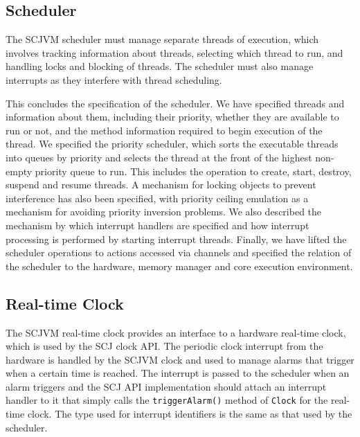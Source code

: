 \subsection{Scheduler}
\label{scheduler-model-section}

The SCJVM scheduler must manage separate threads of execution, which
involves tracking information about threads, selecting which thread to
run, and handling locks and blocking of threads.
The scheduler must also manage interrupts as they interfere with
thread scheduling.



This concludes the specification of the scheduler.
We have specified threads and information about them, including their
priority, whether they are available to run or not, and the method
information required to begin execution of the thread.
We specified the priority scheduler, which sorts the executable
threads into queues by priority and selects the thread at the front of
the highest non-empty priority queue to run.
This includes the operation to create, start, destroy, suspend and
resume threads.
A mechanism for locking objects to prevent interference has also been
specified, with priority ceiling emulation as a mechanism for avoiding
priority inversion problems.
We also described the mechanism by which interrupt handlers are
specified and how interrupt processing is performed by starting
interrupt threads.
Finally, we have lifted the scheduler operations to \Circus{} actions
accessed via channels and specified the relation of the scheduler to
the hardware, memory manager and core execution environment.

\subsection{Real-time Clock}
\label{realtime-clock-model-section}

The SCJVM real-time clock provides an interface to a hardware
real-time clock, which is used by the SCJ clock API. 
The periodic clock interrupt from the hardware is handled by the SCJVM
clock and used to manage alarms that trigger when a certain time is
reached. 
The interrupt is passed to the scheduler when an alarm triggers and
the SCJ API implementation should attach an interrupt handler to it
that simply calls the \texttt{triggerAlarm()} method of \texttt{Clock}
for the real-time clock. 
The type used for interrupt identifiers is the same as that used by
the scheduler.

